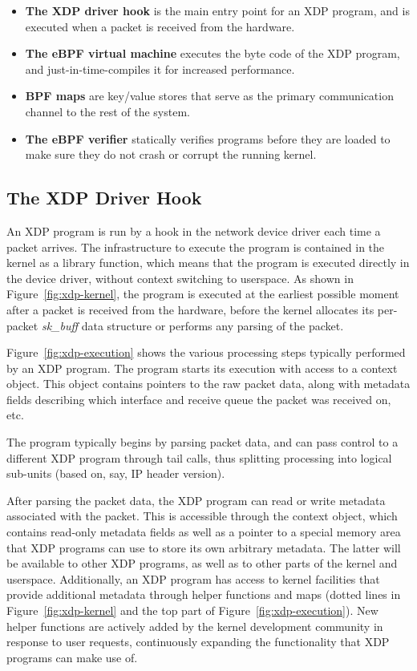 \documentclass[sigconf]{acmart}
\begin{document}
\begin{itemize}
\item \textbf{The XDP driver hook} is the main entry point for an XDP program,
  and is executed when a packet is received from the hardware.

\item \textbf{The eBPF virtual machine} executes the byte code of the XDP
  program, and just-in-time-compiles it for increased performance.

\item \textbf{BPF maps} are key/value stores that serve as the primary
  communication channel to the rest of the system.

\item \textbf{The eBPF verifier} statically verifies programs before they are
  loaded to make sure they do not crash or corrupt the running kernel.
\end{itemize}


\subsection{The XDP Driver Hook}
\label{sec:prog-model}


An XDP program is run by a hook in the network device driver each time a packet
arrives. The infrastructure to execute the program is contained in the kernel as
a library function, which means that the program is executed directly in the
device driver, without context switching to userspace. As shown in
Figure~\ref{fig:xdp-kernel}, the program is executed at the earliest possible
moment after a packet is received from the hardware, before the kernel allocates
its per-packet \emph{sk\_buff} data structure or performs any parsing of the
packet.

Figure~\ref{fig:xdp-execution} shows the various processing steps typically
performed by an XDP program. The program starts its execution with access to a
context object. This object contains pointers to the raw packet data, along with
metadata fields describing which interface and receive queue the packet was
received on, etc.

The program typically begins by parsing packet data, and can pass control to a
different XDP program through tail calls, thus splitting processing into
logical sub-units (based on, say, IP header version).

After parsing the packet data, the XDP program can read or write metadata
associated with the packet. This is accessible through the context object, which
contains read-only metadata fields as well as a pointer to a special memory area
that XDP programs can use to store its own arbitrary metadata. The latter will
be available to other XDP programs, as well as to other parts of the kernel and
userspace. Additionally, an XDP program has access to kernel facilities that
provide additional metadata through helper functions and maps (dotted lines in
Figure~\ref{fig:xdp-kernel} and the top part of Figure~\ref{fig:xdp-execution}).
New helper functions are actively added by the kernel development community in
response to user requests, continuously expanding the functionality that XDP
programs can make use of.
\end{document}
